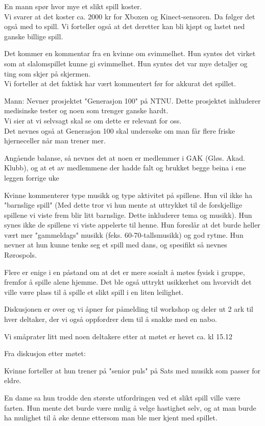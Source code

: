 En mann spør hvor mye et slikt spill koster. \\
Vi svarer at det koster ca. 2000 kr for Xboxen og Kinect-sensoren. Da følger det også med to spill. Vi forteller også at det deretter kan bli kjøpt og lastet ned ganske billige spill.

Det kommer en kommentar fra en kvinne om svimmelhet. Hun syntes det virket som at slalomspillet kunne gi svimmelhet. Hun syntes det var mye detaljer og ting som skjer på skjermen. \\
Vi forteller at det faktisk har vært kommentert før for akkurat det spillet.

Mann: Nevner prosjektet "Generasjon 100" på NTNU. Dette prosjektet inkluderer medisinske tester og noen som trenger ganske hardt. \\
Vi sier at vi selvsagt skal se om dette er relevant for oss. \\ 
Det nevnes også at Generasjon 100 skal undersøke om man får flere friske hjerneceller når man trener mer.

Angående balanse, så nevnes det at noen er medlemmer i GAK 
(Gløs. Akad. Klubb), og at et av medlemmene der hadde falt og brukket
begge beina i ene leggen forrige uke

Kvinne kommenterer type musikk og type aktivitet på spillene.
Hun vil ikke ha "barnslige spill" (Med dette tror vi hun mente at uttrykket til de forskjellige spillene vi viste frem blir litt barnslige. Dette inkluderer tema og musikk). Hun synes ikke de spillene vi viste appelerte til henne. Hun foreslår at det burde heller vært mer "gammeldags" musikk (feks. 60-70-tallsmusikk) og god rytme. Hun nevner at hun kunne tenke seg et spill med dans, og spesifikt så nevnes Rørospols.

Flere er enige i en påstand om at det er mere sosialt å møtes fysisk 
i gruppe, fremfor å spille alene hjemme. Det ble også uttrykt usikkerhet om hvorvidt det ville være plass til å spille et slikt spill i en liten leilighet. 

Diskusjonen er over og vi åpner for påmelding til workshop og deler ut 2 ark til hver deltaker, der vi også oppfordrer dem til å snakke med en nabo.

Vi småprater litt med noen deltakere etter at møtet er hevet ca. kl 15.12

Fra diskusjon etter møtet: 

Kvinne forteller at hun trener på "senior puls" på Sats med musikk som passer for eldre.

En dame sa hun trodde den største utfordringen ved et slikt spill ville være farten. Hun mente det burde være mulig å velge hastighet selv, og at man burde ha mulighet til å øke denne ettersom man ble mer kjent med spillet.

